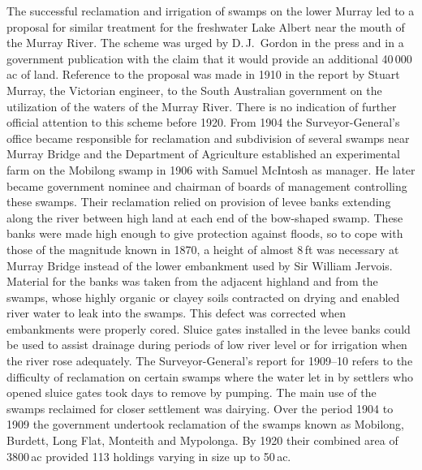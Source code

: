 The successful reclamation and irrigation of swamps on the lower
Murray led to a proposal for similar treatment for the freshwater Lake
Albert near the mouth of the Murray River.  The scheme was urged by
D.\,J.~Gordon in the press and in a government publication with the
claim that it would provide an additional 40\,000\,ac of land.
Reference to the proposal was made in 1910 in the report by Stuart
Murray, the Victorian engineer, to the South Australian government on
the utilization of the waters of the Murray River. There is no
indication of further official attention to this scheme before 1920.
From 1904 the Surveyor-General's office became responsible for
reclamation and subdivision of several swamps near Murray Bridge and
the Department of Agriculture established an experimental farm on the
Mobilong swamp in 1906 with Samuel McIntosh as manager.  He later
became government nominee and chairman of boards of management
controlling these swamps.  Their reclamation relied on provision of
levee banks extending along the river between high land at each end of
the bow-shaped swamp.  These banks were made high enough to give
protection against floods, so to cope with those of the magnitude
known in 1870, a height of almost 8\,ft was necessary at Murray Bridge
instead of the lower embankment used by Sir William Jervois.  Material
for the banks was taken from the adjacent highland and from the
swamps, whose highly organic or clayey soils contracted on drying and
enabled river water to leak into the swamps.  This defect was
corrected when embankments were properly cored.  Sluice gates
installed in the levee banks could be used to assist drainage during
periods of low river level or for irrigation when the river rose
adequately. The Surveyor-General's report for 1909--10 refers to the
difficulty of reclamation on certain swamps where the water let in by
settlers who opened sluice gates took days to remove by pumping.  The
main use of the swamps reclaimed for closer settlement was dairying.
Over the period 1904 to 1909 the government undertook reclamation of
the swamps known as Mobilong, Burdett, Long Flat, Monteith and
Mypolonga.  By 1920 their combined area of 3800\,ac provided 113
holdings varying in size up to 50\,ac.

